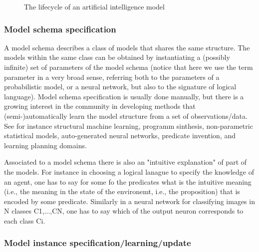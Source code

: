 \begin{figure}
\begin{center}
\end{center}
\caption{\label{fig:ai-model-lifecylce} The lifecycle of an artificial
  intelligence model}
\end{figure}

\subsubsection{Model schema specification}

A model schema describes a class of models that shares the same structure. The models within the same class can be obtained by instantiating a (possibly infinite) set of parameters of the model schema (notice that here we use the term parameter in a very broad sense, referring both to the parameters of a probabilistic model, or a neural network, but also to the signature of logical language). Model schema specification is usually done manually, but there is a growing interest in the community in developing methods that (semi-)automatically learn the model structure from a set of observations/data. See for instance structural machine learning, programm sinthesis, non-parametric statistical models, auto-generated neural networks, predicate invention, and learning planning domains.

Associated to a model schema there is also an "intuitive explanation" of part of the models. For instance in choosing a logical lanague to specify the knowledge of an agent, one has to say for some fo the predicates what is the intuitive meaning (i.e., the meaning in the state of the environemt, i.e., the proposition) that is encoded by some predicate. Similarly in a neural network for classifying images in N classes C1,...,CN, one has to say which of the output neuron corresponds to each class Ci.

\subsubsection{Model instance specification/learning/update}

